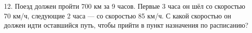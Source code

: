 12. Поезд должен пройти 700 км за 9 часов. Первые 3 часа он шёл со скоростью 70 км/ч, следующие 2 часа --- со скоростью 85 км/ч. С какой скоростью он должен идти оставшийся путь, чтобы прийти в пункт назначения по расписанию?\\
